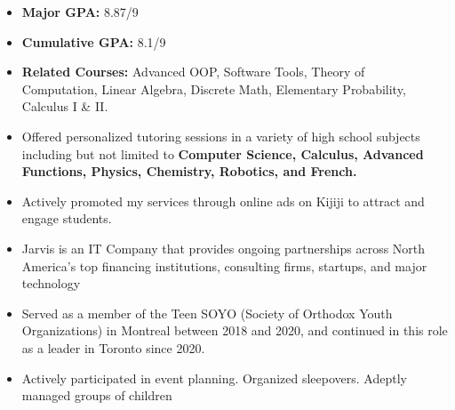 \documentclass[10pt,a4paper,ragged2e,withhyper]{altacv}
\begin{document}
\begin{paracol}{2}


\begin{itemize}
\item \textbf{Major GPA:} 8.87/9
\item \textbf{Cumulative GPA:} 8.1/9
\item \textbf{Related Courses:} Advanced OOP, Software Tools, Theory of \\Computation, Linear Algebra, Discrete Math, Elementary Probability, Calculus I \& II.
\end{itemize}


\begin{itemize}
\item Offered personalized tutoring sessions in a variety of high school subjects including but not limited to \textbf{Computer Science, Calculus, Advanced Functions, Physics, Chemistry, Robotics, and French.}
\item Actively promoted my services through online ads on Kijiji to attract and engage students.
\end{itemize}



\begin{itemize}
    \item Jarvis is an IT Company that provides ongoing partnerships across North America's top financing institutions, consulting firms, startups, and major technology
\end{itemize}

\begin{itemize}
    \item Served as a member of the Teen SOYO (Society of Orthodox Youth Organizations) in Montreal between 2018 and 2020, and continued in this role as a leader in Toronto since 2020.
    \item Actively participated in event planning. Organized sleepovers. Adeptly managed groups of children
\end{itemize}



\end{paracol}
\end{document}
